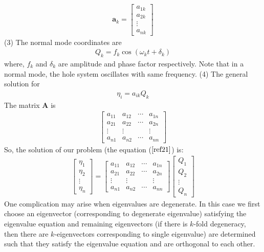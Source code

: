   \begin{align}
  \mathbf{a}_{k}=\left[\begin{array}{c}
  a_{1 k} \\
  a_{2 k} \\
  \vdots \\
  a_{n k}
  \end{array}\right]\label{ref19}
  \end{align}
  (3) The normal mode coordinates are
  \begin{align}
  Q_{k}=f_{k} \cos \left(\omega_{k} t+\delta_{k}\right)\label{ref20}
  \end{align}
  where, $f_{k}$ and $\delta_{k}$ are amplitude and phase factor respectively. Note that in a normal mode, the hole system oscillates with same frequency.
  (4) The general solution for
  \begin{align}
  \eta_{i}=a_{i k} Q_{k}\label{ref21}
  \end{align}
   The matrix $\mathbf{A}$ is 
   \begin{align}
   \left[\begin{array}{llll}a_{11} & a_{12} & \cdots & a_{1 n} \\ a_{21} & a_{22} & \cdots & a_{2 n} \\ \vdots & \vdots & & \vdots \\ a_{n 1} & a_{n 2} & \cdots & a_{n n}\end{array}\right]\label{22}
   \end{align}
  So, the solution of our problem (the equation ($\ref{ref21}$) is:
 \begin{align}
  \left[\begin{array}{l}
 \eta_{1} \\
 \eta_{2} \\
 \vdots \\
 \eta_{n}
 \end{array}\right]=\left[\begin{array}{llll}
 a_{11} & a_{12} & \cdots & a_{1 n} \\
 a_{21} & a_{22} & \cdots & a_{2 n} \\
 \vdots & \vdots & & \vdots \\
 a_{n 1} & a_{n 2} & \cdots & a_{n n}
 \end{array}\right]\left[\begin{array}{l}
 Q_{1} \\
 Q_{2} \\
 \vdots \\
 Q_{n}
 \end{array}\right] 
 \end{align}
 One complication may arise when eigenvalues are degenerate. In this case we first choose an eigenvector (corresponding to degenerate eigenvalue) satisfying the eigenvalue equation and remaining eigenvectors (if there is $k$-fold degeneracy, then there are $k$-eigenvectors corresponding to single eigenvalue) are determined such that they satisfy the eigenvalue equation and are orthogonal to each other.